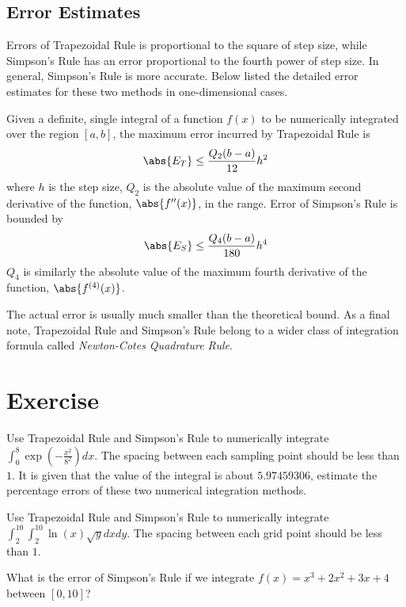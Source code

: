 \subsection{Error Estimates}
Errors of Trapezoidal Rule is proportional to the square of step size, while Simpson’s Rule has an error proportional to the fourth power of step size. In general, Simpson’s Rule is more accurate. Below listed the detailed error estimates for these two methods in one-dimensional cases.
\begin{proper}
Given a definite, single integral of a function $f(x)$ to be numerically integrated over the region $[a,b]$, the maximum error incurred by Trapezoidal Rule is
\begin{align*}
\abs{E_T} \leq \frac{Q_2(b-a)}{12}h^2
\end{align*}
where $h$ is the step size, $Q_2$ is the absolute value of the maximum second derivative of the function, $\abs{f''(x)}$, in the range. Error of Simpson's Rule is bounded by
\begin{align*}
\abs{E_S} \leq \frac{Q_4(b-a)}{180}h^4
\end{align*}
$Q_4$ is similarly the absolute value of the maximum fourth derivative of the function, $\abs{f^{(4)}(x)}$.
\end{proper}
The actual error is usually much smaller than the theoretical bound. As a final note, Trapezoidal Rule and Simpson’s Rule belong to a wider class of integration formula called \textit{Newton-Cotes Quadrature Rule}.

\section{Exercise}

\begin{Exercise}
Use Trapezoidal Rule and Simpson's Rule to numerically integrate $\int_0^{8} \exp(-\frac{x^2}{8^2}) dx$. The spacing between each sampling point should be less than $1$. It is given that the value of the integral is about $5.97459306$, estimate the percentage errors of these two numerical integration methods.
\end{Exercise}

\begin{Exercise}
Use Trapezoidal Rule and Simpson's Rule to numerically integrate $\int_2^{10}\int_2^{10} \ln(x)\sqrt{y} dxdy$. The spacing between each grid point should be less than $1$.
\end{Exercise}

\begin{Exercise}
What is the error of Simpson's Rule if we integrate $f(x) = x^3 + 2x^2 + 3x + 4$ between $[0, 10]$?
\end{Exercise}